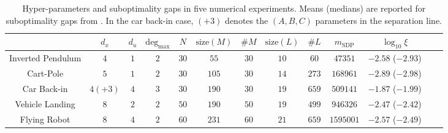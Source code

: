
\begin{table}[t]
    \label{tab:exp:gen:hyper-params}
    \centering
    \resizebox{\columnwidth}{!} {
    \begin{tabular}{|c|c|c|c|c|c|c|c|c|c|c|c|c|}
        \hline
        & $d_x$ & $d_u$ & $\text{deg}_{\max}$ & $N$ & $\text{size}(M)$ & $\#M$ & $\text{size}(L)$ & $\#L$ & $m_{\text{SDP}}$ & $\log_{10}\xi$ \\
        \hline 
        Inverted Pendulum & $4$ & $1$ & $2$ & $30$ & $55$ & $30$ & $10$ & $60$ & $47351$ & $\bm{-2.58}$ ($\bm{-2.93}$) \\
        \hline 
        Cart-Pole & $5$ & $1$ & $2$ & $30$ & $105$ & $30$ & $14$ & $273$ & $168961$ & $\bm{-2.89}$ ($\bm{-2.98}$) \\
        \hline 
        Car Back-in & $4 (+3)$ & $4$ & $3$ & $30$  & $190$ & $30$ & $19$ & $659$ & $509141$ & $\bm{-1.87}$ ($\bm{-1.99}$) \\
        \hline 
        Vehicle Landing & $8$ & $2$ & $2$ & $50$ & $190$ & $50$ & $19$ & $499$ & $946326$ & $\bm{-2.47}$ ($\bm{-2.42}$) \\
        \hline 
        Flying Robot & $8$ & $4$ & $2$ & $60$ & $231$ & $60$ & $21$ & $659$ & $1595001$ & $\bm{-2.57}$ ($\bm{-2.49}$) \\
        \hline 
    \end{tabular}
    }

    \caption{Hyper-parameters and suboptimality gaps in five numerical experiments. Means (medians) are reported for suboptimality gaps from \cuadmm. In the car back-in case, $(+3)$ denotes the $(A,B,C)$ parameters in the separation line.}
\end{table}